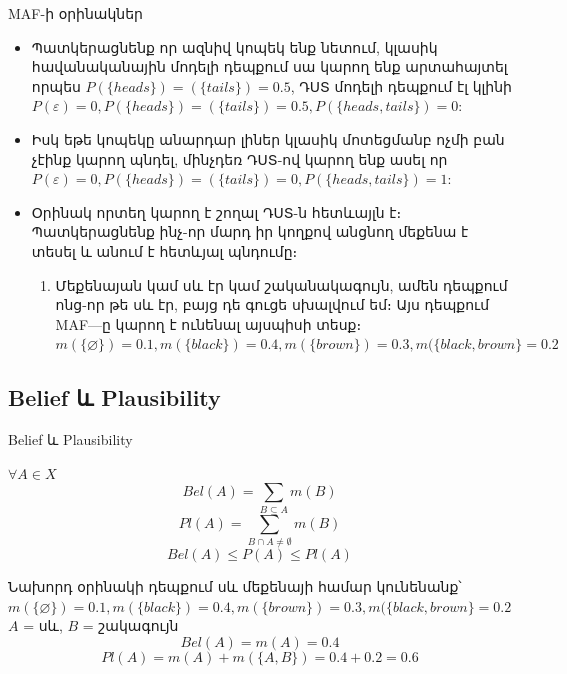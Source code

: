 \documentclass[aspectratio=169]{beamer}
\begin{document}
\begin{frame}{{\rm MAF}-ի օրինակներ}
\begin{itemize}
    \item Պատկերացնենք որ ազնիվ կոպեկ ենք նետում, կլասիկ հավանականային մոդելի դեպքում սա կարող ենք արտահայտել որպես $P(\{heads\}) = (\{tails\}) = 0.5$, ԴՍՏ մոդելի դեպքում էլ կլինի $P(\varepsilon) = 0, P(\{heads\}) = (\{tails\}) = 0.5, P(\{heads, tails\}) = 0$:
    \pause
    \item Իսկ եթե կոպեկը անարդար լիներ կլասիկ մոտեցմանբ ոչմի բան չէինք կարող պնդել, մինչդեռ ԴՍՏ-ով կարող ենք ասել որ $P(\varepsilon) = 0, P(\{heads\}) = (\{tails\}) = 0, P(\{heads, tails\}) = 1$:
    \pause
    \item Օրինակ որտեղ կարող է շողալ ԴՍՏ-ն հետևայլն է։ Պատկերացնենք ինչ-որ մարդ իր կողքով անցնող մեքենա է տեսել և անում է հետևյալ պնդումը։ 
    \begin{enumerate}
        \item Մեքենայան կամ սև էր կամ շականակագույն, ամեն դեպքում ոնց-որ թե սև էր, բայց դե գուցե սխալվում եմ։ 
        Այս դեպքում {\rm MAF}—ը կարող է ունենալ այսպիսի տեսք։ $m(\{\varnothing\}) = 0.1, m(\{ black\}) = 0.4, m(\{ brown\}) = 0.3, m(\{ black, brown\} = 0.2$
    \end{enumerate}
\end{itemize}
\end{frame}

\subsection{{\rm Belief} և {\rm Plausibility}}
\begin{frame}{{\rm Belief} և {\rm Plausibility}}
    \begin{block}
         $\forall  A  \in X $
          \[
          Bel(A) = \sum_{B \subseteq A} m(B)
          \]
        \[
          Pl(A) = \sum_{B \cap A \neq \emptyset} m(B)
          \]
            \[
            Bel(A) \le P(A) \le Pl(A)
            \]

    Նախորդ օրինակի դեպքում սև մեքենայի համար կունենանք՝
    $m(\{\varnothing\}) = 0.1, m(\{ black\}) = 0.4, m(\{ brown\}) = 0.3, m(\{ black, brown\} = 0.2$ \\
    $A$ = սև, $B$ = շակագույն
          \[
        Bel(A) = m(A) = 0.4 \]
        \[
        Pl(A) = m(A) + m(\{A, B\}) = 0.4 + 0.2 = 0.6
          \]
    \end{block}
    
\end{frame}
\end{document}
